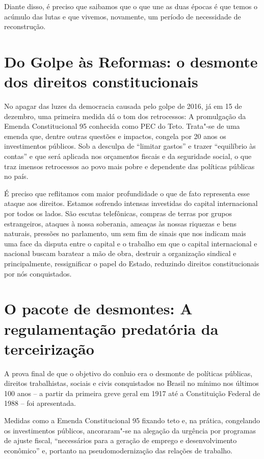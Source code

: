 Diante disso, é preciso que saibamos que o que une as duas épocas é que
temos o acúmulo das lutas e que vivemos, novamente, um período de
necessidade de reconstrução.

\section{Do Golpe às Reformas: o desmonte dos direitos constitucionais}

No apagar das luzes da democracia causada pelo golpe de 2016, já em 15
de dezembro, uma primeira medida dá o tom dos retrocessos: A promulgação
da Emenda Constitucional 95 conhecida como PEC do Teto. Trata"-se de uma
emenda que, dentre outras questões e impactos, congela por 20 anos os
investimentos públicos. Sob a desculpa de ``limitar gastos'' e trazer
``equilíbrio às contas'' e que será aplicada nos orçamentos fiscais e da
seguridade social, o que traz imensos retrocessos ao povo mais pobre e
dependente das políticas públicas no país.

É preciso que reflitamos com maior profundidade o que de fato representa
esse ataque aos direitos. Estamos sofrendo intensas investidas do
capital internacional por todos os lados. São escutas telefônicas,
compras de terras por grupos estrangeiros, ataques à nossa soberania,
ameaças às nossas riquezas e bens naturais, pressões no parlamento, um
sem fim de sinais que nos indicam mais uma face da disputa entre o
capital e o trabalho em que o capital internacional e nacional buscam
baratear a mão de obra, destruir a organização sindical e
principalmente, ressignificar o papel do Estado, reduzindo direitos
constitucionais por nós conquistados.

\section{O pacote de desmontes: A regulamentação predatória da
terceirização}

A prova final de que o objetivo do conluio era o desmonte de políticas
públicas, direitos trabalhistas, sociais e civis conquistados no Brasil
no mínimo nos últimos 100 anos -- a partir da primeira greve geral em
1917 até a Constituição Federal de 1988 -- foi apresentada.

Medidas como a Emenda Constitucional 95 fixando teto e, na prática,
congelando os investimentos públicos, ancoraram"-se na alegação da
urgência por programas de ajuste fiscal, ``necessários para a geração de
emprego e desenvolvimento econômico'' e, portanto na pseudomodernização
das relações de trabalho.

